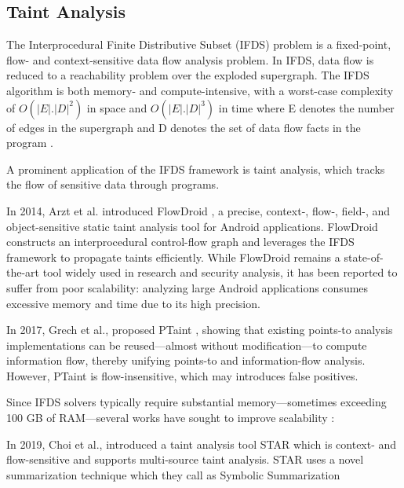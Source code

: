 \subsection{Taint Analysis}

The Interprocedural Finite Distributive Subset (IFDS) problem is a fixed-point, flow- and context-sensitive data flow analysis problem. 
In IFDS, data flow is reduced to a reachability problem over the exploded supergraph. The IFDS algorithm is both memory- and compute-intensive, with a worst-case complexity of
$O(|E| . |D|^2)$ in space and $O(|E| . |D|^3)$ in time where E denotes the number of edges in the supergraph and D denotes the set of data flow facts in the program \cite{reps1995precise}.

A prominent application of the IFDS framework is taint analysis, which tracks the flow of sensitive data through programs.

In 2014, Arzt et al. introduced FlowDroid \cite{arzt2014flowdroid}, a precise, context-, flow-, field-, and object-sensitive static taint analysis tool for Android applications. FlowDroid constructs an interprocedural control-flow graph and leverages the IFDS framework to propagate taints efficiently. 
While FlowDroid remains a state-of-the-art tool widely used in research and security analysis, it has been reported to suffer from poor scalability: 
analyzing large Android applications consumes excessive memory and time due to its high precision. \cite{li2021scaling}


In 2017, Grech et al., proposed PTaint \cite{grech2017p}, showing that existing points-to analysis implementations can be reused—almost without modification—to compute information flow, thereby unifying points-to and information-flow analysis. 
However, PTaint is flow-insensitive, which may introduces false positives.

Since IFDS solvers typically require substantial memory—sometimes exceeding 100 GB of RAM—several works have sought to improve scalability \cite{li2021scaling}:

In 2019, Choi et al., \cite{choi2019scalable} introduced a taint analysis tool STAR which is context- and flow-sensitive and supports multi-source taint analysis.
STAR uses a novel summarization technique which they call as Symbolic Summarization 

